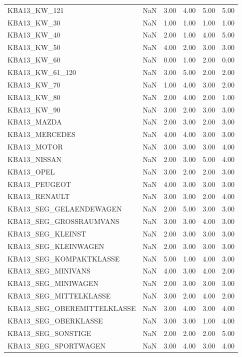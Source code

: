 \begin{longtable}{lp{1cm}p{1cm}p{1cm}p{1cm}p{1cm}}
KBA13\_KW\_121  & NaN & 3.00 & 4.00 & 5.00 & 5.00 \\
KBA13\_KW\_30 & NaN & 1.00 & 1.00 & 1.00 & 1.00 \\
KBA13\_KW\_40 & NaN & 2.00 & 1.00 & 4.00 & 5.00 \\
KBA13\_KW\_50 & NaN & 4.00 & 2.00 & 3.00 & 3.00 \\
KBA13\_KW\_60 & NaN & 0.00 & 1.00 & 2.00 & 0.00 \\
KBA13\_KW\_61\_120  & NaN & 3.00 & 5.00 & 2.00 & 2.00 \\
KBA13\_KW\_70 & NaN & 1.00 & 4.00 & 3.00 & 2.00 \\
KBA13\_KW\_80 & NaN & 2.00 & 4.00 & 2.00 & 1.00 \\
KBA13\_KW\_90 & NaN & 3.00 & 2.00 & 3.00 & 3.00 \\
KBA13\_MAZDA & NaN & 2.00 & 3.00 & 2.00 & 3.00 \\
KBA13\_MERCEDES   & NaN & 4.00 & 4.00 & 3.00 & 3.00 \\
KBA13\_MOTOR & NaN & 3.00 & 3.00 & 3.00 & 4.00 \\
KBA13\_NISSAN  & NaN & 2.00 & 3.00 & 5.00 & 4.00 \\
KBA13\_OPEL & NaN & 3.00 & 2.00 & 2.00 & 3.00 \\
KBA13\_PEUGEOT    & NaN & 4.00 & 3.00 & 3.00 & 3.00 \\
KBA13\_RENAULT    & NaN & 3.00 & 3.00 & 2.00 & 4.00 \\
KBA13\_SEG\_GELAENDEWAGEN   & NaN & 2.00 & 5.00 & 3.00 & 3.00 \\
KBA13\_SEG\_GROSSRAUMVANS   & NaN & 3.00 & 3.00 & 4.00 & 3.00 \\
KBA13\_SEG\_KLEINST  & NaN & 2.00 & 3.00 & 3.00 & 3.00 \\
KBA13\_SEG\_KLEINWAGEN & NaN & 2.00 & 3.00 & 3.00 & 3.00 \\
KBA13\_SEG\_KOMPAKTKLASSE   & NaN & 5.00 & 1.00 & 4.00 & 3.00 \\
KBA13\_SEG\_MINIVANS & NaN & 4.00 & 3.00 & 4.00 & 2.00 \\
KBA13\_SEG\_MINIWAGEN  & NaN & 2.00 & 3.00 & 3.00 & 3.00 \\
KBA13\_SEG\_MITTELKLASSE  & NaN & 3.00 & 2.00 & 4.00 & 2.00 \\
KBA13\_SEG\_OBEREMITTELKLASSE & NaN & 3.00 & 4.00 & 3.00 & 4.00 \\
KBA13\_SEG\_OBERKLASSE & NaN & 3.00 & 3.00 & 1.00 & 4.00 \\
KBA13\_SEG\_SONSTIGE & NaN & 2.00 & 2.00 & 2.00 & 5.00 \\
KBA13\_SEG\_SPORTWAGEN & NaN & 3.00 & 4.00 & 3.00 & 4.00 \\

\end{longtable}
